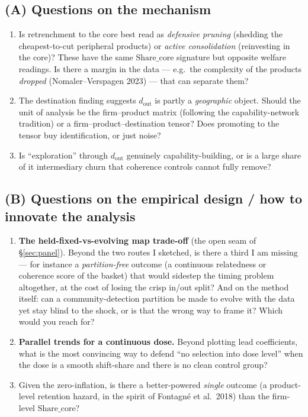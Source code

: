 \documentclass[11pt]{article}
\newcommand{\dout}{d_{\mathrm{out}}}
\newcommand{\sharecore}{\mathrm{Share\_core}}
\begin{document}
\subsection*{(A) Questions on the mechanism}
\begin{enumerate}[leftmargin=1.5em]
  \item Is retrenchment to the core best read as \emph{defensive pruning} (shedding the
        cheapest-to-cut peripheral products) or \emph{active consolidation} (reinvesting
        in the core)? These have the same $\sharecore$ signature but opposite welfare
        readings. Is there a margin in the data --- e.g.\ the complexity of the products
        \emph{dropped} (Nomaler--Verspagen 2023) --- that can separate them?
  \item The destination finding suggests $\dout$ is partly a \emph{geographic} object.
        Should the unit of analysis be the firm--product matrix (following the
        capability-network tradition) or a firm--product--destination tensor? Does
        promoting to the tensor buy identification, or just noise?
  \item Is ``exploration'' through $\dout$ genuinely capability-building, or is a large
        share of it intermediary churn that coherence controls cannot fully remove?
\end{enumerate}

\subsection*{(B) Questions on the empirical design / how to innovate the analysis}
\begin{enumerate}[leftmargin=1.5em]
  \item \textbf{The held-fixed-vs-evolving map trade-off} (the open seam of
        \S\ref{sec:panel}). Beyond the two routes I sketched, is there a third I am
        missing --- for instance a \emph{partition-free} outcome (a continuous relatedness
        or coherence score of the basket) that would sidestep the timing problem
        altogether, at the cost of losing the crisp in/out split? And on the method itself:
        can a community-detection partition be made to evolve with the data yet stay blind
        to the shock, or is that the wrong way to frame it? Which would you reach for?
  \item \textbf{Parallel trends for a continuous dose.} Beyond plotting lead
        coefficients, what is the most convincing way to defend ``no selection into dose
        level'' when the dose is a smooth shift-share and there is no clean control group?
  \item Given the zero-inflation, is there a better-powered \emph{single} outcome (a
        product-level retention hazard, in the spirit of Fontagn\'e et al.\ 2018) than
        the firm-level $\sharecore$?
\end{enumerate}
\end{document}
